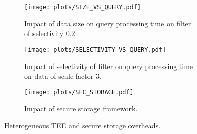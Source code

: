 \begin{figure*}%
\centering
\begin{subfigure}{.3\textwidth}
\centering
\texttt{[image: plots/SIZE\_VS\_QUERY.pdf]}%
\caption{Impact of data size on query processing time on filter of selectivity 0.2.}%
\label{fig:size-vs-query}%
\end{subfigure}\hfill%
\begin{subfigure}{.3\textwidth}
\centering
\texttt{[image: plots/SELECTIVITY\_VS\_QUERY.pdf]}%
\caption{Impact of selectivity of filter on query processing time on data of scale factor 3.}%
\label{fig:sel-vs-query}%
\end{subfigure}\hfill%
\begin{subfigure}{.3\textwidth}
\centering
\texttt{[image: plots/SEC\_STORAGE.pdf]}%
\caption{Impact of secure storage framework.}%
\label{fig:sec-storage}%
\end{subfigure}%
\vspace{-1.5mm}
\caption{\small Heterogeneous TEE and secure storage overheads.\vspace{-5mm}}
\label{fig:all-overheads}
\end{figure*}


